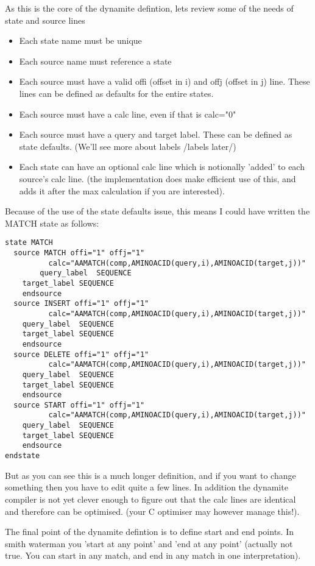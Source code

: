 As this is the core of the dynamite defintion, lets review some
of the needs of state and source lines

\begin{itemize}
\item Each state name must be unique
\item Each source name must reference a state
\item Each source must have a valid offi (offset in i) and offj (offset in j) line.
These lines can be defined as defaults for the entire states.
\item Each source must have a calc line, even if that is calc="0"
\item Each source must have a query and target label. These can be defined as state
defaults. (We'll see more about labels /{labels} later/)
\item Each state can have an optional calc line which is notionally 'added' to each source's
calc line. (the implementation does make efficient use of this, and adds it after the max
calculation if you are interested).
\end{itemize}

Because of the use of the state defaults issue, this means I could
have written the MATCH state as follows:

\begin{verbatim}
state MATCH  
  source MATCH offi="1" offj="1"
          calc="AAMATCH(comp,AMINOACID(query,i),AMINOACID(target,j))"
        query_label  SEQUENCE
    target_label SEQUENCE
    endsource
  source INSERT offi="1" offj="1"
          calc="AAMATCH(comp,AMINOACID(query,i),AMINOACID(target,j))"
    query_label  SEQUENCE
    target_label SEQUENCE
    endsource
  source DELETE offi="1" offj="1"
          calc="AAMATCH(comp,AMINOACID(query,i),AMINOACID(target,j))"
    query_label  SEQUENCE
    target_label SEQUENCE
    endsource
  source START offi="1" offj="1"
          calc="AAMATCH(comp,AMINOACID(query,i),AMINOACID(target,j))"
    query_label  SEQUENCE
    target_label SEQUENCE
    endsource
endstate
\end{verbatim}


But as you can see this is a much longer definition, and if you want to change
something then you have to edit quite a few lines. In addition the dynamite
compiler is not yet clever enough to figure out that the calc lines are
identical and therefore can be optimised. (your C optimiser may however manage
this!).

The final point of the dynamite defintion is to define start and end
points.  In smith waterman you 'start at any point' and 'end at any
point' (actually not true. You can start in any match, and end in any
match in one interpretation).

